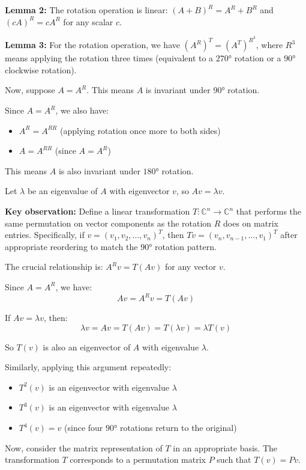 \documentclass[12pt,a4paper]{article}
\theoremstyle{definition}
\begin{document}
    \textbf{Lemma 2:} The rotation operation is linear: $(A + B)^R = A^R + B^R$ and $(cA)^R = cA^R$ for any scalar $c$.

    \textbf{Lemma 3:} For the rotation operation, we have $(A^R)^T = (A^T)^{R^3}$, where $R^3$ means applying the rotation three times (equivalent to a $270°$ rotation or a $90°$ clockwise rotation).

    Now, suppose $A = A^R$. This means $A$ is invariant under $90°$ rotation.

    Since $A = A^R$, we also have:
    \begin{itemize}
        \item $A^R = A^{RR}$ (applying rotation once more to both sides)
        \item $A = A^{RR}$ (since $A = A^R$)
    \end{itemize}

    This means $A$ is also invariant under $180°$ rotation.

    Let $\lambda$ be an eigenvalue of $A$ with eigenvector $v$, so $Av = \lambda v$.

    \textbf{Key observation:} Define a linear transformation $T: \mathbb{C}^n \to \mathbb{C}^n$ that performs the same permutation on vector components as the rotation $R$ does on matrix entries. Specifically, if $v = (v_1, v_2, \ldots, v_n)^T$, then $Tv = (v_n, v_{n-1}, \ldots, v_1)^T$ after appropriate reordering to match the $90°$ rotation pattern.

    The crucial relationship is: $A^R v = T(Av)$ for any vector $v$.

    Since $A = A^R$, we have:
    $$Av = A^R v = T(Av)$$

    If $Av = \lambda v$, then:
    $$\lambda v = Av = T(Av) = T(\lambda v) = \lambda T(v)$$

    So $T(v)$ is also an eigenvector of $A$ with eigenvalue $\lambda$.

    Similarly, applying this argument repeatedly:
    \begin{itemize}
        \item $T^2(v)$ is an eigenvector with eigenvalue $\lambda$
        \item $T^3(v)$ is an eigenvector with eigenvalue $\lambda$
        \item $T^4(v) = v$ (since four $90°$ rotations return to the original)
    \end{itemize}

    Now, consider the matrix representation of $T$ in an appropriate basis. The transformation $T$ corresponds to a permutation matrix $P$ such that $T(v) = Pv$.
\end{document}
